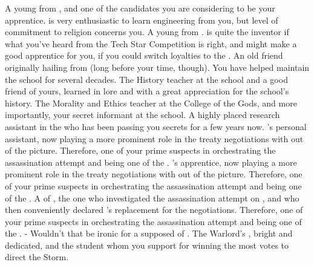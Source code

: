 \documentclass[char]{GL2020}
\begin{document}
\begin{contacts}
	\contact{\cInitiate{}} A young \cInitiate{\person} from \pShip{}, and one of the candidates you are considering to be your apprentice. \cInitiate{} is very enthusiastic to learn engineering from you, but \cInitiate{\their} level of commitment to religion concerns you.
	\contact{\cTechStar{}} A young \cTechStar{\person} from \pTech{}. \cTechStar{} is quite the inventor if what you've heard from the Tech Star Competition is right, and might make a good apprentice for you, if you could switch \cTechStar{\their} loyalties to the \pShip{}.
\contact{\cPrincipal{}} An old friend originally hailing from \pShip{} (long before your time, though). You have helped \cPrincipal{\them} maintain the school for several decades.
	\contact{\cHistory{}} The History teacher at the school and a good friend of yours, learned in lore and with a great appreciation for the school's history.
	\contact{\cEthics{}} The Morality and Ethics teacher at the College of the Gods, and more importantly, your secret informant at the school.
	\contact{\cAssistantScientist{}} A highly placed research assistant in the \pTech{} who has been passing you secrets for a few years now.
	\contact{\cChupLeader{}} \cHeadDiplomat{}'s personal assistant, now playing a more prominent role in the treaty negotiations with \cHeadDiplomat{} out of the picture. Therefore, one of your prime suspects in orchestrating the assassination attempt and being one of the \pGoaties{}.
	\contact{\cJuniorStatesman{}} \cHeadDiplomat{}'s apprentice, now playing a more prominent role in the treaty negotiations with \cHeadDiplomat{} out of the picture. Therefore, one of your prime suspects in orchestrating the assassination attempt and being one of the \pGoaties{}.
	\contact{\cEbbPriest{}} A \cEbbPriest{\cleric} of \cEbb{}, the one who investigated the assassination attempt on \cHeadDiplomat{}, and who then conveniently declared \cEbbPriest{\themself} \cHeadDiplomat{}'s replacement for the negotiations. Therefore, one of your prime suspects in orchestrating the assassination attempt and being one of the \pGoaties{}. - Wouldn't that be ironic for a supposed \cEbbPriest{\cleric} of \cEbb{}.
		\contact{\cWarlordDaughter{}} The Warlord's \cWarlordDaughter{\child}, bright and dedicated, and the student whom you support for winning the most votes to direct the Storm.
\end{contacts}
\end{document}
